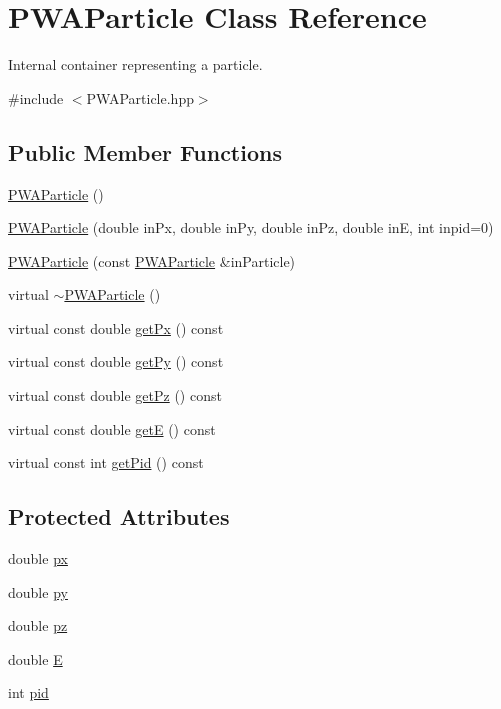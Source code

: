 \hypertarget{classPWAParticle}{
\section{PWAParticle Class Reference}
\label{d9/dcb/classPWAParticle}
}


Internal container representing a particle.  




{\ttfamily \#include $<$PWAParticle.hpp$>$}

\subsection*{Public Member Functions}
\begin{DoxyCompactItemize}
\item 
\hyperlink{classPWAParticle_ad2757e82d6f72eb190f2a5530f5873d3}{PWAParticle} ()
\item 
\hyperlink{classPWAParticle_a05dccc6d5ab7b646a08970cd170afcd5}{PWAParticle} (double inPx, double inPy, double inPz, double inE, int inpid=0)
\item 
\hyperlink{classPWAParticle_a0d440b263ef67cbfca30cbed4c8d3bb0}{PWAParticle} (const \hyperlink{classPWAParticle}{PWAParticle} \&inParticle)
\item 
virtual \hyperlink{classPWAParticle_af90e6b356ab1069a0f3aa09b6b1be95e}{$\sim$PWAParticle} ()
\item 
virtual const double \hyperlink{classPWAParticle_a983609ee7bb185843079a9efc34224ec}{getPx} () const 
\item 
virtual const double \hyperlink{classPWAParticle_aadee7eda584f3efb78ed942f3bf02f46}{getPy} () const 
\item 
virtual const double \hyperlink{classPWAParticle_af367d5bac6dc8995d071b4435da8de9c}{getPz} () const 
\item 
virtual const double \hyperlink{classPWAParticle_a1b4990b52e0a4de681e1192645c60d53}{getE} () const 
\item 
virtual const int \hyperlink{classPWAParticle_a0ae39e4858d572a07bd0fac1de0c2d31}{getPid} () const 
\end{DoxyCompactItemize}
\subsection*{Protected Attributes}
\begin{DoxyCompactItemize}
\item 
double \hyperlink{classPWAParticle_a785b498941ebc062698dbd34be8c6d96}{px}
\item 
double \hyperlink{classPWAParticle_a51a443171d65b2abd885c51f92068f85}{py}
\item 
double \hyperlink{classPWAParticle_aaf5605fd8e557449072e9437add86a15}{pz}
\item 
double \hyperlink{classPWAParticle_ae1b3e03ff18925509275e763e3a76417}{E}
\item 
int \hyperlink{classPWAParticle_af45a7569c8ddbf0b8971cbbc24ab879d}{pid}
\end{DoxyCompactItemize}



